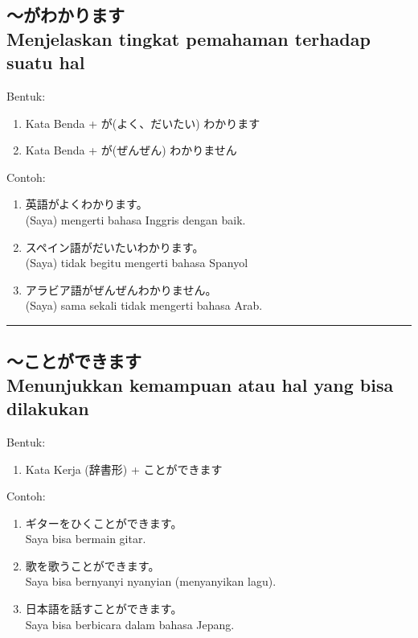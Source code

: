 \subsection*{
    ～がわかります \\
    Menjelaskan tingkat pemahaman terhadap suatu hal
}
Bentuk:
\begin{enumerate}
    \item Kata Benda + が(よく、だいたい) わかります
    \item Kata Benda + が(ぜんぜん) わかりません
\end{enumerate}
Contoh: 
\begin{enumerate}
    \item 英語がよくわかります。
    \\ (Saya) mengerti bahasa Inggris dengan baik.
    \item スペイン語がだいたいわかります。
    \\ (Saya) tidak begitu mengerti bahasa Spanyol
    \item アラビア語がぜんぜんわかりません。
    \\ (Saya) sama sekali tidak mengerti bahasa Arab.
\end{enumerate}

\vspace{0.2cm}\hrule height 1pt\vspace{0.2cm}

\newpage
\subsection*{
    ～ことができます \\
    Menunjukkan kemampuan atau hal yang bisa dilakukan
}
Bentuk:
\begin{enumerate}
    \item Kata Kerja (辞書形) + ことができます
\end{enumerate}
Contoh: 
\begin{enumerate}
    \item ギターをひくことができます。
    \\ Saya bisa bermain gitar.
    \item 歌を歌うことができます。
    \\ Saya bisa bernyanyi nyanyian (menyanyikan lagu).
    \item 日本語を話すことができます。
    \\ Saya bisa berbicara dalam bahasa Jepang.
\end{enumerate}

